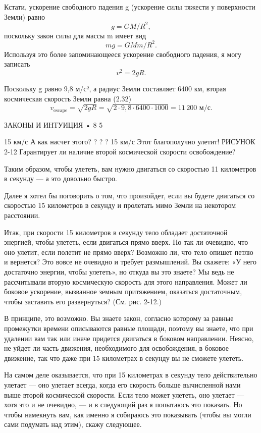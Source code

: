 \documentclass[10pt,oneside]{article}
\begin{document}
Кстати, ускорение свободного падения g (ускорение силы тяжести у поверхности Земли) равно \[g = GM/R^2,\] поскольку закон силы для массы m имеет вид \[mg = GMm/R^2.\] Используя это более запоминающееся ускорение свободного падения, я могу записать \[v^2 = 2gR.\]\par

Поскольку g равно 9,8 м/с², а радиус Земли составляет 6400 км, вторая космическая скорость Земли равна (2.32) \[v_{\text{escape}} = \sqrt{2gR} = \sqrt{2 \cdot 9,8 \cdot 6400 \cdot 1000} = 11\,200\text{ м/с}.\]\par

ЗАКОНЫ И ИНТУИЦИЯ • 8 5\par

15 км/с А как насчет этого? ? ? ? 15 км/с Этот благополучно улетит! РИСУНОК 2-12 Гарантирует ли наличие второй космической скорости освобождение?\par

Таким образом, чтобы улететь, вам нужно двигаться со скоростью 11 километров в секунду --- а это довольно быстро.\par

Далее я хотел бы поговорить о том, что произойдет, если вы будете двигаться со скоростью 15 километров в секунду и пролетать мимо Земли на некотором расстоянии.\par

Итак, при скорости 15 километров в секунду тело обладает достаточной энергией, чтобы улететь, если двигаться прямо вверх. Но так ли очевидно, что оно улетит, если полетит не прямо вверх? Возможно ли, что тело опишет петлю и вернется? Это вовсе не очевидно и требует размышлений. Вы скажете: «У него достаточно энергии, чтобы улететь», но откуда вы это знаете? Мы ведь не рассчитывали вторую космическую скорость для этого направления. Может ли боковое ускорение, вызванное земным притяжением, оказаться достаточным, чтобы заставить его развернуться? (См. рис. 2-12.)\par

В принципе, это возможно. Вы знаете закон, согласно которому за равные промежутки времени описываются равные площади, поэтому вы знаете, что при удалении вам так или иначе придется двигаться в боковом направлении. Неясно, не уйдет ли часть движения, необходимого для освобождения, в боковое движение, так что даже при 15 километрах в секунду вы не сможете улететь.\par

На самом деле оказывается, что при 15 километрах в секунду тело действительно улетает --- оно улетает всегда, когда его скорость больше вычисленной нами выше второй космической скорости. Если тело может улететь, оно улетает --- хотя это и не очевидно, --- и в следующий раз я попытаюсь это показать. Но чтобы намекнуть вам, как именно я собираюсь это показывать (чтобы вы могли сами подумать над этим), скажу следующее.\par
\end{document}
